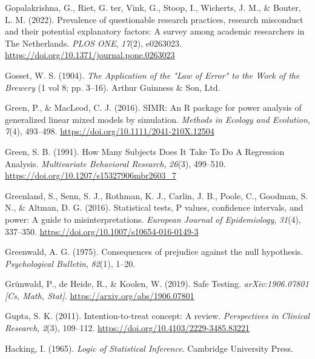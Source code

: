 \documentclass[
  letterpaper,
  DIV=11,
  numbers=noendperiod]{scrreprt}
\newlength{\cslhangindent}
\newlength{\cslentryspacingunit} %
\newenvironment{CSLReferences}[2] %
 {%
  \setlength{\parindent}{0pt}
  \ifodd #1
  \let\oldpar\par
  \def\par{\hangindent=\cslhangindent\oldpar}
  \fi
  \setlength{\parskip}{#2\cslentryspacingunit}
 }%
 {}
\begin{document}
\begin{CSLReferences}{1}{0}
\leavevmode{}%
Gopalakrishna, G., Riet, G. ter, Vink, G., Stoop, I., Wicherts, J. M.,
\& Bouter, L. M. (2022). Prevalence of questionable research practices,
research misconduct and their potential explanatory factors: {A} survey
among academic researchers in {The Netherlands}. \emph{PLOS ONE},
\emph{17}(2), e0263023.
\url{https://doi.org/10.1371/journal.pone.0263023}

\leavevmode{}%
Gosset, W. S. (1904). \emph{The {Application} of the "{Law} of {Error}"
to the {Work} of the {Brewery}} (1 vol 8; pp. 3--16). {Arthur Guinness
\& Son, Ltd.}

\leavevmode{}%
Green, P., \& MacLeod, C. J. (2016). {SIMR}: An {R} package for power
analysis of generalized linear mixed models by simulation. \emph{Methods
in Ecology and Evolution}, \emph{7}(4), 493--498.
\url{https://doi.org/10.1111/2041-210X.12504}

\leavevmode{}%
Green, S. B. (1991). How {Many Subjects Does It Take To Do A Regression
Analysis}. \emph{Multivariate Behavioral Research}, \emph{26}(3),
499--510. \url{https://doi.org/10.1207/s15327906mbr2603_7}

\leavevmode{}%
Greenland, S., Senn, S. J., Rothman, K. J., Carlin, J. B., Poole, C.,
Goodman, S. N., \& Altman, D. G. (2016). Statistical tests, {P} values,
confidence intervals, and power: A guide to misinterpretations.
\emph{European Journal of Epidemiology}, \emph{31}(4), 337--350.
\url{https://doi.org/10.1007/s10654-016-0149-3}

\leavevmode{}%
Greenwald, A. G. (1975). Consequences of prejudice against the null
hypothesis. \emph{Psychological Bulletin}, \emph{82}(1), 1--20.

\leavevmode{}%
Grünwald, P., de Heide, R., \& Koolen, W. (2019). Safe {Testing}.
\emph{arXiv:1906.07801 {[}Cs, Math, Stat{]}}.
\url{https://arxiv.org/abs/1906.07801}

\leavevmode{}%
Gupta, S. K. (2011). Intention-to-treat concept: {A} review.
\emph{Perspectives in Clinical Research}, \emph{2}(3), 109--112.
\url{https://doi.org/10.4103/2229-3485.83221}

\leavevmode{}%
Hacking, I. (1965). \emph{Logic of {Statistical Inference}}. {Cambridge
University Press}.


\end{CSLReferences}
\end{document}
